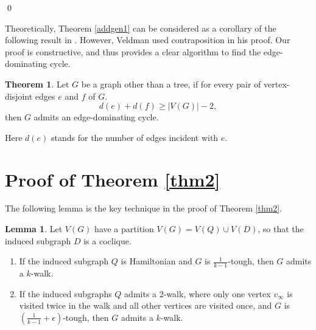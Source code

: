 \documentclass{amsart}
\theoremstyle{definition}
\newtheorem{theorem}{Theorem}
\newtheorem{lemma}{Lemma}
\begin{document}
\qed

Theoretically, Theorem \ref{addgen1} can be considered as a corollary of the following result in \cite{veldman83}. However, Veldman used contraposition in his proof. Our proof is constructive, and thus provides a clear algorithm to find the edge-dominating cycle.

\begin{theorem}\label{veldman2}{\cite[Theorem 2]{veldman83}}
Let $G$ be a graph other than a tree, if for every pair of vertex-disjoint edges $e$ and $f$ of $G$.
$$d(e)+d(f)\ge|V(G)|-2,$$
then $G$ admits an edge-dominating cycle.
\end{theorem}

Here $d(e)$ stands for the number of edges incident with $e$.
\section{Proof of Theorem \ref{thm2}}





The following lemma is the key technique in the proof of Theorem \ref{thm2}.

\begin{lemma}\label{addtec}
Let $V(G)$ have a partition $V(G)=V(Q)\cup V(D)$, 
so that the induced subgraph $D$ is a coclique.
\begin{enumerate} 
\item If the induced subgraph $Q$ is Hamiltonian 
and $G$ is $\frac{1}{k-1}$-tough, 
then $G$ admits a $k$-walk.\label{itone}
\item If the induced subgraphs $Q$ admits a 2-walk, 
where only one vertex $v_{\infty}$ is visited twice in the walk 
and all other vertices are visited once, and $G$ is $(\frac{1}{k-1}+\epsilon)$-tough, then $G$ admits a $k$-walk.\label{ittwo}
\end{enumerate}
\end{lemma}
\end{document}
